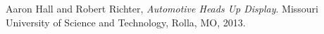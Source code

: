 \begin{thebibliography}{9}

	Aaron Hall and Robert Richter,
	\emph{Automotive Heads Up Display}.
	Missouri University of Science and Technology,
	Rolla, MO,
	2013.

\end{thebibliography}
